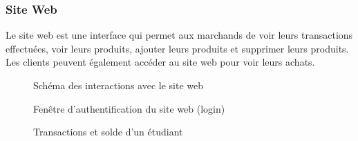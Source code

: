 		
		\subsubsection{Site Web}
		Le site web est une interface qui permet aux marchands de voir leurs transactions effectuées, voir leurs produits, ajouter leurs produits et supprimer leurs produits. Les clients peuvent également accéder au site web pour voir leurs achats.
		
		\begin{figure}[p]
			\centering
			
			\caption{Schéma des interactions avec le site web}
			\label{fig.schema}
		\end{figure}

		\begin{figure}[p]
			\caption{Fenêtre d’authentification du site web (login)}
			\label{fig.auth}
		\end{figure}

		\begin{figure}[p]
			\caption{Transactions et solde d’un étudiant}
			\label{fig.transEtudiant}
		\end{figure}
		
